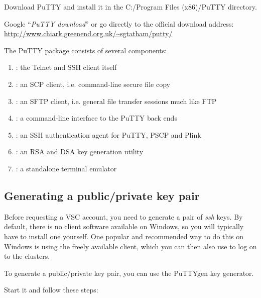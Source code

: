   Download PuTTY and install it in the C:/Program Files (x86)/PuTTY directory.

  Google ``\emph{PuTTY download}'' or go directly to the official download
  address: \url{http://www.chiark.greenend.org.uk/\~sgtatham/putty/}

  The PuTTY package consists of several components:

  \begin{enumerate}
    \item  {}: the Telnet and SSH client itself
    \item  {}: an SCP client, i.e. command-line secure file copy
    \item  {}: an SFTP client, i.e. general file transfer sessions much like FTP
    \item  {}: a command-line interface to the PuTTY back ends
    \item  {}: an SSH authentication agent for PuTTY, PSCP and Plink
    \item  {}: an RSA and DSA key generation utility
    \item  {}: a standalone terminal emulator
  \end{enumerate}

  \subsection{Generating a public/private key pair}
  \label{sec:generate-key-pair}

  Before requesting a VSC account, you need to generate a pair of \emph{ssh}
  keys. By default, there is no  client software available
  on Windows, so you will typically have to install one yourself. One popular and
  recommended way to do this on Windows is using the freely available
   client, which you can then also use to log on to the
  clusters.

  To generate a public/private key pair, you can use the PuTTYgen key generator.

  Start  it and follow these steps:

